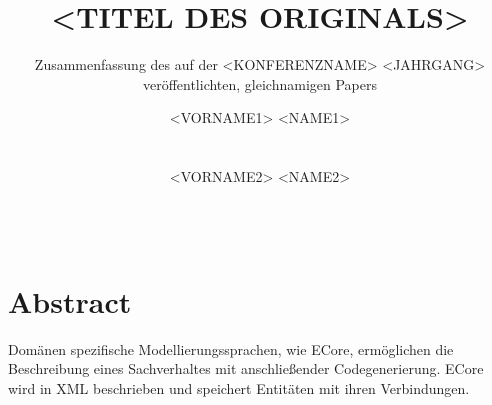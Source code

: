 \documentclass[ngerman]{ewks-latex}
\begin{document}
\title{<TITEL DES ORIGINALS>}

\subtitle{Zusammenfassung des auf der <KONFERENZNAME> <JAHRGANG> veröffentlichten, gleichnamigen Papers}

\author{
	\alignauthor
	<VORNAME1> <NAME1>\\
	\\
    \\
	\alignauthor
	<VORNAME2> <NAME2>\\
	\\
    \\
}

\maketitle

\section{Abstract}
Domänen spezifische Modellierungssprachen, wie ECore, ermöglichen die Beschreibung eines Sachverhaltes mit anschließender Codegenerierung. ECore wird in XML beschrieben und speichert Entitäten mit ihren Verbindungen. 

\end{document}
